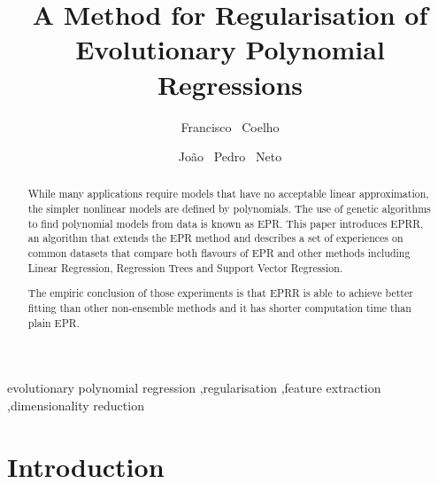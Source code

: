 \documentclass[preprint,authoryear,12pt]{elsarticle}
\begin{document}
\begin{frontmatter}

\title{A Method for Regularisation of Evolutionary Polynomial Regressions}

\author[ue,labmag]{Francisco ~Coelho}

\author[fcul,labmag]{João ~Pedro ~Neto}


\address[ue]{Dept. Informática, Universidade de Évora, Rua Romão Ramalho 58, 7000-671 Évora}
\address[fcul]{Dept. Informática, Faculdade de Ciências da Universidade de Lisboa, Campo Grande 1749-016 Lisboa}
\address[labmag]{Laboratory of Agent Modelling (LabMAg)}
%
%
\begin{abstract}
While many applications require models that have no acceptable linear approximation, the simpler nonlinear models are defined by polynomials. The use of genetic algorithms to find polynomial models from data is known as \ac{EPR}.
%
This paper introduces \ac{EPRR}, an algorithm that extends the \ac{EPR} method and describes a set of experiences on common datasets that compare both flavours of \ac{EPR} and other methods including Linear Regression, Regression Trees and Support Vector Regression.

The empiric conclusion of those experiments is that \ac{EPRR} is able to achieve better fitting than other non-ensemble methods and it has shorter computation time than plain \ac{EPR}.
\end{abstract}
%
\begin{keyword}
evolutionary polynomial regression \sep regularisation \sep feature extraction \sep dimensionality reduction 
\end{keyword}
\end{frontmatter}
%
%
%
%
\section{Introduction}
\end{document}
